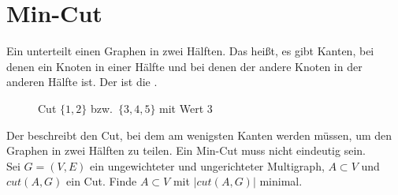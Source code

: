 \documentclass{scrartcl}%
\begin{document}

    \section*{Min-Cut}
    \begin{definition}
        Ein  unterteilt einen Graphen in zwei Hälften.
        Das heißt, es gibt Kanten, bei denen ein Knoten in einer
        Hälfte und bei denen der andere Knoten in der anderen Hälfte ist.
        Der  ist die .
    \end{definition}

    \begin{figure}[htb]
        \centering

        \caption*{Cut $\{1,2\}$ bzw.\ $\{3,4,5\}$ mit Wert 3}
    \end{figure}

    \begin{definition}
        Der  beschreibt den Cut, bei dem am wenigsten Kanten  werden müssen,
        um den Graphen in zwei Hälften zu teilen. Ein Min-Cut muss nicht eindeutig sein.\\

         Sei $G=(V,E)$ ein ungewichteter und ungerichteter Multigraph,
        $A \subset V$ und $cut(A, G)$ ein Cut.
        Finde $A \subset V$ mit $\vert cut(A,G)\vert$ minimal.
    \end{definition}
\end{document}
